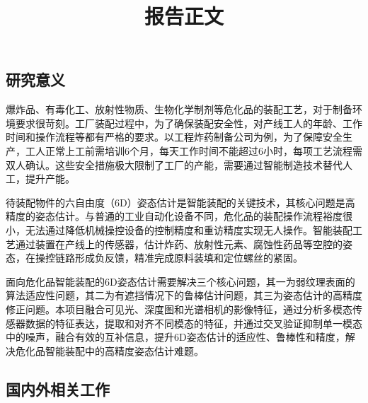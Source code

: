\documentclass[12pt]{article}
\begin{document}

\title{报告正文}
\maketitle
\thispagestyle{empty}




\subsection{研究意义}

爆炸品、有毒化工、放射性物质、生物化学制剂等危化品的装配工艺，对于制备环境要求很苛刻。工厂装配过程中，为了确保装配安全性，对产线工人的年龄、工作时间和操作流程等都有严格的要求。以工程炸药制备公司为例，为了保障安全生产，工人正常上工前需培训6个月，每天工作时间不能超过6小时，每项工艺流程需双人确认。这些安全措施极大限制了工厂的产能，需要通过智能制造技术替代人工，提升产能。

待装配物件的六自由度（6D）姿态估计是智能装配的关键技术，其核心问题是高精度的姿态估计。与普通的工业自动化设备不同，危化品的装配操作流程裕度很小，无法通过降低机械操控设备的控制精度和重访精度实现无人操作。智能装配工艺通过装置在产线上的传感器，估计炸药、放射性元素、腐蚀性药品等空腔的姿态，在操控链路形成负反馈，精准完成原料装填和定位螺丝的紧固。

面向危化品智能装配的6D姿态估计需要解决三个核心问题，其一为弱纹理表面的算法适应性问题，其二为有遮挡情况下的鲁棒估计问题，其三为姿态估计的高精度修正问题。本项目融合可见光、深度图和光谱相机的影像特征，通过分析多模态传感器数据的特征表达，提取和对齐不同模态的特征，并通过交叉验证抑制单一模态中的噪声，融合有效的互补信息，提升6D姿态估计的适应性、鲁棒性和精度，解决危化品智能装配中的高精度姿态估计难题。

\subsection{国内外相关工作}
\end{document}
